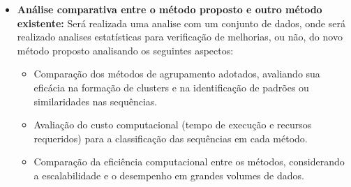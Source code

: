 \begin{itemize}
  \item \textbf{Análise comparativa entre o método proposto e outro método existente:} Será realizada uma analise com um conjunto de dados, onde será realizado analises estatísticas para verificação de melhorias, ou não, do novo método proposto analisando os seguintes aspectos:
        \begin{itemize}
          \item Comparação dos métodos de agrupamento adotados, avaliando sua eficácia na formação de clusters e na identificação de padrões ou similaridades nas sequências.
          \item Avaliação do custo computacional (tempo de execução e recursos requeridos) para a classificação das sequências em cada método.
          \item Comparação da eficiência computacional entre os métodos, considerando a escalabilidade e o desempenho em grandes volumes de dados.
        \end{itemize}
\end{itemize}





